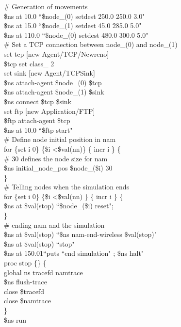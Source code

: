 \documentclass[times,10pt,onecolumn]{article}
\begin{document}
\# Generation of movements\\
\$ns at 10.0 ``\$node\_(0) setdest 250.0 250.0 3.0"\\
\$ns at 15.0 ``\$node\_(1) setdest 45.0 285.0 5.0"\\
\$ns at 110.0 ``\$node\_(0) setdest 480.0 300.0 5.0" \\

\# Set a TCP connection between node\_(0) and node\_(1) \\
set tcp [new Agent/TCP/Newreno] \\
\$tcp set class\_ 2 \\
set sink [new Agent/TCPSink] \\
\$ns attach-agent \$node\_(0) \$tcp \\
\$ns attach-agent \$node\_(1) \$sink \\
\$ns connect \$tcp \$sink \\
set ftp [new Application/FTP] \\
\$ftp attach-agent \$tcp \\
\$ns at 10.0 ``\$ftp start" \\ 



\# Define node initial position in nam\\
for \{set i 0\} \{\$i \textless  \$val(nn)\} \{ incr i \} \{\\
\# 30 defines the node size for nam\\
\$ns initial\_node\_pos \$node\_(\$i) 30\\
\}\\

\# Telling nodes when the simulation ends\\
for \{set i 0\} \{\$i \textless  \$val(nn) \} \{ incr i \} \{\\
    \$ns at \$val(stop) ``\$node\_(\$i) reset";\\
\}\\

\# ending nam and the simulation \\
\$ns at \$val(stop) ``\$ns nam-end-wireless \$val(stop)"\\
\$ns at \$val(stop) ``stop"\\
\$ns at 150.01``puts ``end simulation" ; \$ns halt"\\
proc stop \{\} \{\\
    global ns tracefd namtrace\\
    \$ns flush-trace\\
    close \$tracefd\\
    close \$namtrace\\
\}\\

\$ns run\\
\end{document}
